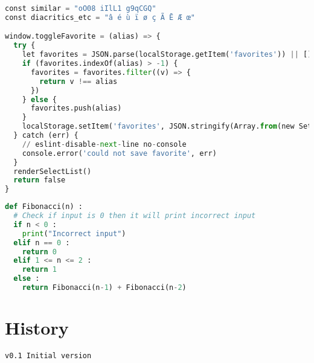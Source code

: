 \documentclass{article}
\begin{document}
\begin{lstlisting}[language=python,basicstyle=\footnotesize\jetbrainscode,commentstyle=\itshape\color{gray},keywordstyle=\bfseries\color{magenta},tabsize=4,frame=single,columns=flexible,showstringspaces=false]
const similar = "oO08 iIlL1 g9qCGQ"
const diacritics_etc = "â é ù ï ø ç Ã Ē Æ œ"

window.toggleFavorite = (alias) => {
  try {
    let favorites = JSON.parse(localStorage.getItem('favorites')) || []
    if (favorites.indexOf(alias) > -1) {
      favorites = favorites.filter((v) => {
        return v !== alias
      })
    } else {
      favorites.push(alias)
    }
    localStorage.setItem('favorites', JSON.stringify(Array.from(new Set(favorites))))
  } catch (err) {
    // eslint-disable-next-line no-console
    console.error('could not save favorite', err)
  }
  renderSelectList()
  return false
}
\end{lstlisting}

\begin{lstlisting}[language=python,basicstyle=\footnotesize\jetbrainscode,commentstyle=\itshape\color{gray},keywordstyle=\bfseries\color{magenta},tabsize=4,frame=single,columns=flexible,showstringspaces=false]
def Fibonacci(n) :
  # Check if input is 0 then it will print incorrect input
  if n < 0 :
    print("Incorrect input")
  elif n == 0 :
    return 0
  elif 1 <= n <= 2 :
    return 1
  else :
    return Fibonacci(n-1) + Fibonacci(n-2)
\end{lstlisting}

\pagebreak

\section{History}

\begin{verbatim}
v0.1 Initial version
\end{verbatim}
\end{document}
